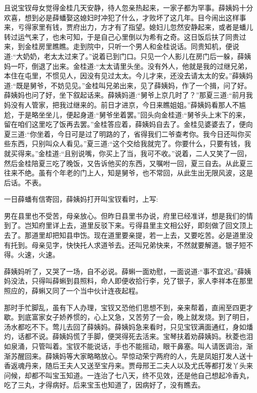 \begin{parag}
    且说宝钗母女觉得金桂几天安静，待人忽亲热起来，一家子都为罕事。薛姨妈十分欢喜，想到必是薛蟠娶这媳妇时冲犯了什么，才败坏了这几年。目今闹出这样事来，亏得家里有钱，贾府出力，方才有了指望。媳妇儿忽然安静起来，或者是蟠儿转过运气来了，也未可知，于是自己心里倒以为希有之奇。这日饭后扶了同贵过来，到金桂房里瞧瞧。走到院中，只听一个男人和金桂说话。同贵知机，便说道:“大奶奶，老太太过来了。”说着已到门口。只见一个人影儿在房门后一躲，薛姨妈一吓，倒退了出来。金桂道:“太太请里头坐。没有外人，他就是我的过继兄弟，本住在屯里，不惯见人，因没有见过太太。今儿才来，还没去请太太的安。”薛姨妈道:“既是舅爷，不妨见见。”金桂叫兄弟出来，见了薛姨妈，作了一个揖，问了好。薛姨妈也问了好，坐下叙起话来。薛姨妈道:“舅爷上京几时了？”那夏三道:“前月我妈没有人管家，把我过继来的。前日才进京，今日来瞧姐姐。”薛姨妈看那人不尴尬，于是略坐坐儿，便起身道:“舅爷坐着罢。”回头向金桂道:“舅爷头上末下的来，留在咱们这里吃了饭再去罢。”金桂答应着，薛姨妈自去了。金桂见婆婆去了，便向夏三道:“你坐着，今日可是过了明路的了，省得我们二爷查考你。我今日还叫你买些东西，只别叫众人看见。”夏三道:“这个交给我就完了。你要什么，只要有钱，我就买得来。”金桂道:“且别说嘴，你买上了当，我可不收。”说着，二人又笑了一回，然后金桂陪夏三吃了晚饭，又告诉他买的东西，又嘱咐一回，夏三自去。从此夏三往来不绝。虽有个年老的门上人，知是舅爷，也不常回，从此生出无限风波，这是后话。不表。
\end{parag}


\begin{parag}
    一日薛蟠有信寄回，薛姨妈打开叫宝钗看时，上写:
\end{parag}


\begin{qute2sp}
    男在县里也不受苦，母亲放心。但昨日县里书办说，府里已经准详，想是我们的情到了。岂知府里详上去，道里反驳下来。亏得县里主文相公好，即刻做了回文顶上去了。那道里却把知县申饬。现在道里要亲提，若一上去，又要吃苦。必是道里没有托到。母亲见字，快快托人求道爷去。还叫兄弟快来，不然就要解道。银子短不得。火速，火速。
\end{qute2sp}


\begin{parag}
    薛姨妈听了，又哭了一场，自不必说。薛蝌一面劝慰，一面说道:“事不宜迟。”薛姨妈没法，只得叫薛蝌到县照料，命人即便收拾行李，兑了银子，家人李祥本在那里照应的，薛蝌又同了一个当中伙计连夜起程。
\end{parag}


\begin{parag}
    那时手忙脚乱，虽有下人办理，宝钗又恐他们思想不到，亲来帮着，直闹至四更才歇。到底富家女子娇养惯的，心上又急，又苦劳了一会，晚上就发烧。到了明日，汤水都吃不下。莺儿去回了薛姨妈。薛姨妈急来看时，只见宝钗满面通红，身如燔灼，话都不说。薛姨妈慌了手脚，便哭得死去活来。宝琴扶着劝薛姨妈。秋菱也泪如泉涌，只管叫着。宝钗不能说话，手也不能摇动，眼干鼻塞。叫人请医调治，渐渐苏醒回来。薛姨妈等大家略略放心。早惊动荣宁两府的人，先是凤姐打发人送十香返魂丹来，随后王夫人又送至宝丹来。贾母邢王二夫人以及尤氏等都打发丫头来问候，却都不叫宝玉知道。一连治了七八天，终不见效，还是他自己想起冷香丸，吃了三丸，才得病好。后来宝玉也知道了，因病好了，没有瞧去。
\end{parag}


